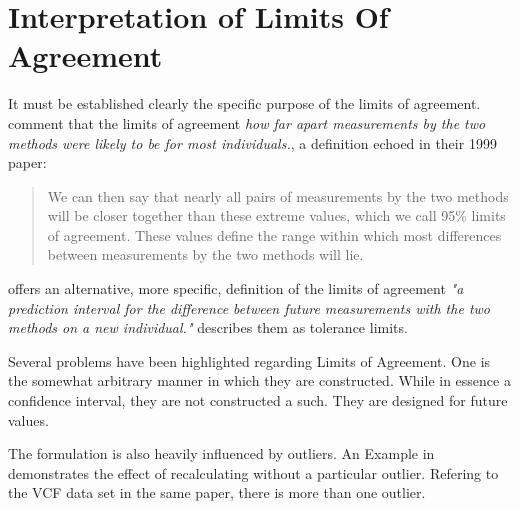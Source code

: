 \documentclass[12pt, a4paper]{report}
\theoremstyle{plain}
\theoremstyle{definition}
\theoremstyle{remark}
\begin{document}
\section{Interpretation of Limits Of Agreement}
It must be established
clearly the specific purpose of the limits of agreement.
\citet*{BA95} comment that the limits of agreement \emph{how far
	apart measurements by the two methods were likely to be for most
	individuals.}, a definition echoed in their 1999 paper:
\begin{quote} We can then say that nearly all pairs
	of measurements by the two methods will be closer together than
	these extreme values, which we call 95\% limits of agreement.
	These values define the range within which most differences
	between measurements by the two methods will lie\citep{BA99}.
\end{quote}
\citet{BXC2008} offers an alternative, more specific,  definition of
the limits of agreement \emph{"a prediction interval for the
	difference between future measurements with the two methods on a
	new individual."} \citet{luiz} describes them as tolerance limits.













Several problems have been highlighted regarding Limits of
Agreement. One is the somewhat arbitrary manner in which they are
constructed. While in essence a confidence interval, they are not
constructed a such. They are designed for future values.

The formulation is also heavily influenced by outliers. An Example
in \citet*{BA83} demonstrates the effect of recalculating without
a particular outlier. Refering to the VCF data set in the same
paper, there is more than one outlier.
\end{document}

